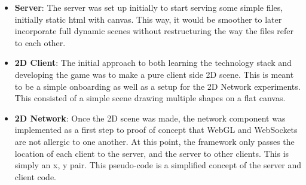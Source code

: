 \documentclass{acmsiggraph}
\begin{document}
\begin{itemize}
    \item{\textbf{Server}: The server was set up initially to start serving some simple files, initially static html with canvas. This way, it would be smoother to later incorporate full dynamic scenes without restructuring the way the files refer to each other.}
    \item{\textbf{2D Client}: The initial approach to both learning the technology stack and developing the game was to make a pure client side 2D scene. This is meant to be a simple onboarding as well as a setup for the 2D Network experiments. This consisted of a simple scene drawing multiple shapes on a flat canvas.}
    \item{\textbf{2D Network}: Once the 2D scene was made, the network component was implemented as a first step to proof of concept that WebGL and WebSockets are not allergic to one another. At this point, the framework only passes the location of each client to the server, and the server to other clients. This is simply an x, y pair. This pseudo-code is a simplified concept of the server and client code.}
\end{itemize}
\end{document}

